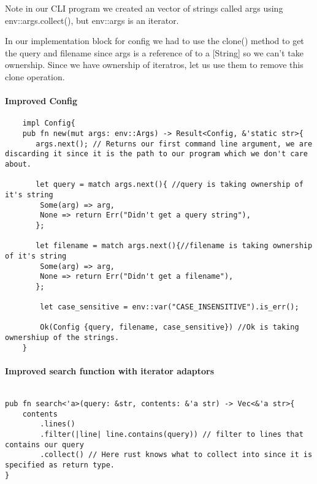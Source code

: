 Note in our CLI program we created an vector of strings called args using env::args.collect(), but env::args is an iterator.

In our implementation block for config we had to use the clone() method to get the query and filename since args is a reference of to a [String] so we can't take ownership. Since we have ownership of iteratros, let us use them to remove this clone operation. 

\paragraph*{Improved Config}\begin{lstlisting}
    impl Config{
    pub fn new(mut args: env::Args) -> Result<Config, &'static str>{
       args.next(); // Returns our first command line argument, we are discarding it since it is the path to our program which we don't care about.

       let query = match args.next(){ //query is taking ownership of it's string
        Some(arg) => arg, 
        None => return Err("Didn't get a query string"),
       };

       let filename = match args.next(){//filename is taking ownership of it's string
        Some(arg) => arg,
        None => return Err("Didn't get a filename"),
       };
        
        let case_sensitive = env::var("CASE_INSENSITIVE").is_err(); 

        Ok(Config {query, filename, case_sensitive}) //Ok is taking ownershiup of the strings.
    } 
\end{lstlisting}

\paragraph*{Improved search function with iterator adaptors}\begin{lstlisting}
    
pub fn search<'a>(query: &str, contents: &'a str) -> Vec<&'a str>{
    contents
        .lines()
        .filter(|line| line.contains(query)) // filter to lines that contains our query
        .collect() // Here rust knows what to collect into since it is specified as return type.
}
\end{lstlisting}

\newpage
